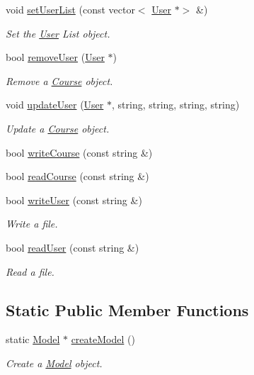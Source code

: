 \begin{DoxyCompactItemize}
void \hyperlink{classModelImpl_a617c58790e2b2207a3ce7e860a56e3a1}{set\+User\+List} (const vector$<$ \hyperlink{classUser}{User} $\ast$$>$ \&)
\begin{DoxyCompactList}\small\item\em Set the \hyperlink{classUser}{User} List object. \end{DoxyCompactList}\item 
bool \hyperlink{classModelImpl_a51130aa538cd27b1cac6919cbbef05ee}{remove\+User} (\hyperlink{classUser}{User} $\ast$)
\begin{DoxyCompactList}\small\item\em Remove a \hyperlink{classCourse}{Course} object. \end{DoxyCompactList}\item 
void \hyperlink{classModelImpl_a8088106fd8837da688f9334ab143db4c}{update\+User} (\hyperlink{classUser}{User} $\ast$, string, string, string, string)
\begin{DoxyCompactList}\small\item\em Update a \hyperlink{classCourse}{Course} object. \end{DoxyCompactList}\item 
bool \hyperlink{classModelImpl_a6ce3d79c0b49abe19c034dfb30d023d7}{write\+Course} (const string \&)
\item 
bool \hyperlink{classModelImpl_aba86d399703fe35c086d6ff5647e48da}{read\+Course} (const string \&)
\item 
bool \hyperlink{classModelImpl_a42b5948a513af3e20645cdb63fb6be76}{write\+User} (const string \&)
\begin{DoxyCompactList}\small\item\em Write a file. \end{DoxyCompactList}\item 
bool \hyperlink{classModelImpl_a132c46a2d6ca86c7374a065b3079fe15}{read\+User} (const string \&)
\begin{DoxyCompactList}\small\item\em Read a file. \end{DoxyCompactList}\end{DoxyCompactItemize}
\subsection*{Static Public Member Functions}
\begin{DoxyCompactItemize}
\item 
static \hyperlink{classModel}{Model} $\ast$ \hyperlink{classModelImpl_a8a9167b35336431e394f0042271620cb}{create\+Model} ()
\begin{DoxyCompactList}\small\item\em Create a \hyperlink{classModel}{Model} object. \end{DoxyCompactList}\end{DoxyCompactItemize}

